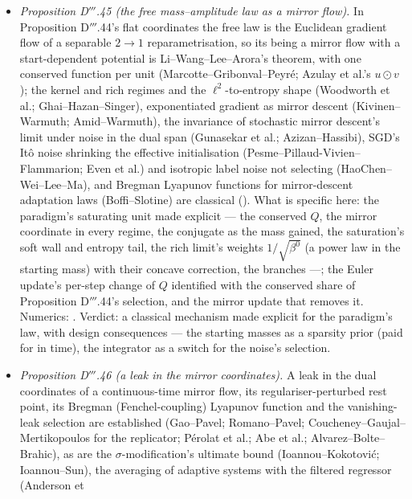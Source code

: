 \begin{itemize}
    (none in continuous time; Heun's scheme removes most of it) ---, not a better sparse solver; for self-adaptive kernel
    networks with an explicit update a slow measurement noise prunes the dictionary, slowly (millions of updates here).
  \item \emph{Proposition D$'''$.45 (the free mass--amplitude law as a mirror flow).} In Proposition D$'''$.44's flat
    coordinates the free law is the Euclidean gradient flow of a separable $2\to1$ reparametrisation, so its being a
    mirror flow with a start-dependent potential is Li--Wang--Lee--Arora's theorem, with one conserved function per unit
    (Marcotte--Gribonval--Peyr\'e; Azulay et al.'s $u\odot v$); the kernel and rich regimes and the $\ell^2$-to-entropy
    shape (Woodworth et al.; Ghai--Hazan--Singer), exponentiated gradient as mirror descent (Kivinen--Warmuth;
    Amid--Warmuth), the invariance of stochastic mirror descent's limit under noise in the dual span (Gunasekar et al.;
    Azizan--Hassibi), SGD's It\^o noise shrinking the effective initialisation (Pesme--Pillaud-Vivien--Flammarion; Even et
    al.) and isotropic label noise not selecting (HaoChen--Wei--Lee--Ma), and Bregman Lyapunov functions for
    mirror-descent adaptation laws (Boffi--Slotine) are classical (\cite{S72}). What is specific here: the paradigm's
    saturating unit made explicit --- the conserved $Q$, the mirror coordinate in every regime, the conjugate as the mass
    gained, the saturation's soft wall and entropy tail, the rich limit's weights $1/\sqrt{\beta^0}$ (a power law in the
    starting mass) with their concave correction, the branches ---; the Euler update's per-step change of $Q$ identified
    with the conserved share of Proposition D$'''$.44's selection, and the mirror update that removes it. Numerics:
    . Verdict: a classical mechanism made explicit for the paradigm's law, with design
    consequences --- the starting masses as a sparsity prior (paid for in time), the integrator as a switch for the
    noise's selection.
  \item \emph{Proposition D$'''$.46 (a leak in the mirror coordinates).} A leak in the dual coordinates of a
    continuous-time mirror flow, its regulariser-perturbed rest point, its Bregman (Fenchel-coupling) Lyapunov function
    and the vanishing-leak selection are established (Gao--Pavel; Romano--Pavel; Coucheney--Gaujal--Mertikopoulos for
    the replicator; P\'erolat et al.; Abe et al.; Alvarez--Bolte--Brahic), as are the $\sigma$-modification's ultimate
    bound (Ioannou--Kokotovi\'c; Ioannou--Sun), the averaging of adaptive systems with the filtered regressor (Anderson et

\end{itemize}
